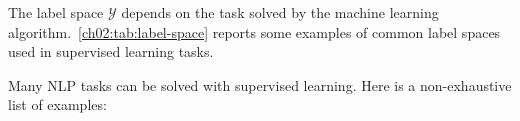     The label space $\mathcal{Y}$ depends on the task solved by the
    machine learning algorithm.~\autoref{ch02:tab:label-space} reports some
    examples of common label spaces used in supervised learning tasks.

    \begin{table}[h]
      \centering
      \caption{Examples of label spaces for different supervised learning
      tasks.}
      \label{ch02:tab:label-space}
    \end{table}

    Many NLP tasks can be solved with supervised learning. Here is a
    non-exhaustive list of examples:

